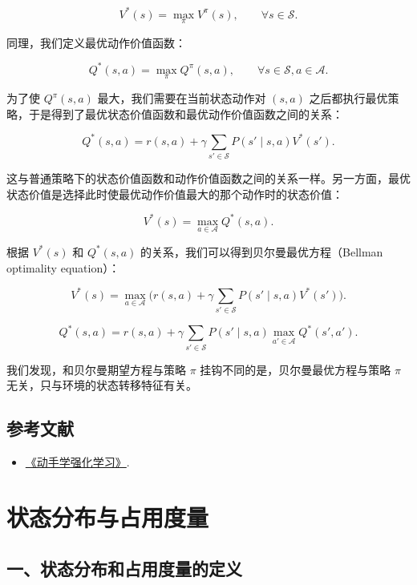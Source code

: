 \[
V^{*}(s)=\max_{\pi}V^{\pi}(s),\qquad \forall s\in\mathcal{S}.
\]

同理，我们定义最优动作价值函数：

\[
Q^{*}(s,a)=\max_{\pi}Q^{\pi}(s,a),\qquad \forall s\in\mathcal{S},a\in\mathcal{A}.
\]

为了使 \(Q^{\pi}(s,a)\) 最大，我们需要在当前状态动作对 \((s,a)\) 之后都执行最优策略，于是得到了最优状态价值函数和最优动作价值函数之间的关系：

\[
Q^{*}(s,a)=r(s,a)+\gamma\sum_{s'\in\mathcal{S}}P(s'\mid s,a)V^{*}(s').
\]

这与普通策略下的状态价值函数和动作价值函数之间的关系一样。另一方面，最优状态价值是选择此时使最优动作价值最大的那个动作时的状态价值：

\[
V^{*}(s)=\max_{a\in\mathcal{A}}Q^{*}(s,a).
\]

根据 \(V^{*}(s)\) 和 \(Q^{*}(s,a)\) 的关系，我们可以得到贝尔曼最优方程（Bellman optimality equation）：

\[
V^{*}(s)=\max_{a\in\mathcal{A}}\bigl(r(s,a)+\gamma\sum_{s'\in\mathcal{S}}P(s'\mid s,a)V^{*}(s')\bigr).
\]

\[
Q^{*}(s,a)=r(s,a)+\gamma\sum_{s'\in\mathcal{S}}P(s'\mid s,a)
\max_{a'\in\mathcal{A}}Q^{*}(s',a').
\]

我们发现，和贝尔曼期望方程与策略 \(\pi\) 挂钩不同的是，贝尔曼最优方程与策略 \(\pi\) 无关，只与环境的状态转移特征有关。

\hypertarget{ux53c2ux8003ux6587ux732e-43}{%
\subsection{参考文献}\label{ux53c2ux8003ux6587ux732e-43}}

\vspace{0.25em}
\begin{itemize}
\tightlist
\item
  \href{https://hrl.boyuai.com/}{《动手学强化学习》}.
\end{itemize}

\clearpage

\hypertarget{ux72b6ux6001ux5206ux5e03ux4e0eux5360ux7528ux5ea6ux91cf}{%
\section{状态分布与占用度量}\label{ux72b6ux6001ux5206ux5e03ux4e0eux5360ux7528ux5ea6ux91cf}}

\hypertarget{ux4e00ux72b6ux6001ux5206ux5e03ux548cux5360ux7528ux5ea6ux91cfux7684ux5b9aux4e49}{%
\subsection{一、状态分布和占用度量的定义}\label{ux4e00ux72b6ux6001ux5206ux5e03ux548cux5360ux7528ux5ea6ux91cfux7684ux5b9aux4e49}}

